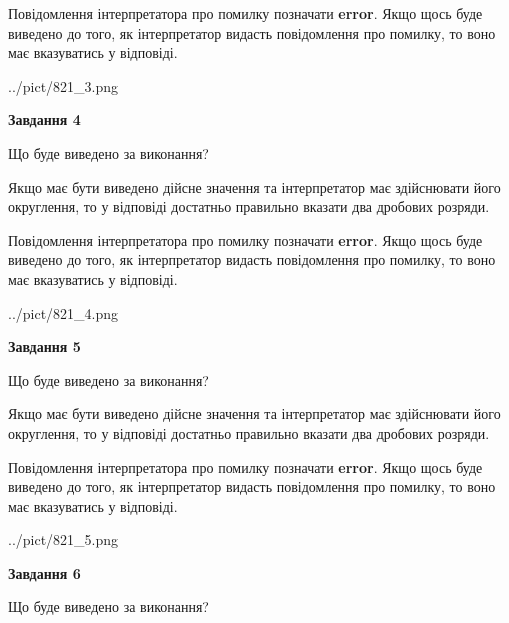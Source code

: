 \documentclass[12pt, ukrainian]{article}
\begin{document}
{\begin {Large}
Повідомлення інтерпретатора про помилку позначати \textbf{error}.
Якщо щось буде виведено до того, як інтерпретатор видасть повідомлення про помилку, 
то воно має вказуватись у відповіді. \par

\begin{center}
	{../pict/821_3.png}
\end{center}
\newpage

{\begin {center}\textbf{Завдання 4}\end {center}}\par
Що буде виведено за виконання? \par

Якщо має бути виведено дійсне значення та інтерпретатор має здійснювати його округлення, 
то у відповіді достатньо правильно вказати два дробових розряди.

Повідомлення інтерпретатора про помилку позначати \textbf{error}.
Якщо щось буде виведено до того, як інтерпретатор видасть повідомлення про помилку, 
то воно має вказуватись у відповіді. \par

\begin{center}
	{../pict/821_4.png}
\end{center}
\newpage

{\begin {center}\textbf{Завдання 5}\end {center}}\par
Що буде виведено за виконання? \par

Якщо має бути виведено дійсне значення та інтерпретатор має здійснювати його округлення, 
то у відповіді достатньо правильно вказати два дробових розряди.

Повідомлення інтерпретатора про помилку позначати \textbf{error}.
Якщо щось буде виведено до того, як інтерпретатор видасть повідомлення про помилку, 
то воно має вказуватись у відповіді. \par

\begin{center}
	{../pict/821_5.png}
\end{center}
\newpage

{\begin {center}\textbf{Завдання 6}\end {center}}\par
Що буде виведено за виконання? \par


\end{Large}}
\end{document}
